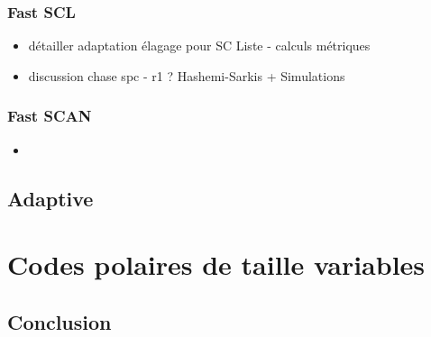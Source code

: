 \subsubsection{Fast SCL}
\begin{itemize}
\item détailler adaptation élagage pour SC Liste - calculs métriques
\item discussion chase spc - r1 ? Hashemi-Sarkis + Simulations
\end{itemize}
\subsubsection{Fast SCAN}
\begin{itemize}
\item 
\end{itemize}

\subsection{Adaptive}

\section{Codes polaires de taille variables}


\subsection*{Conclusion}
